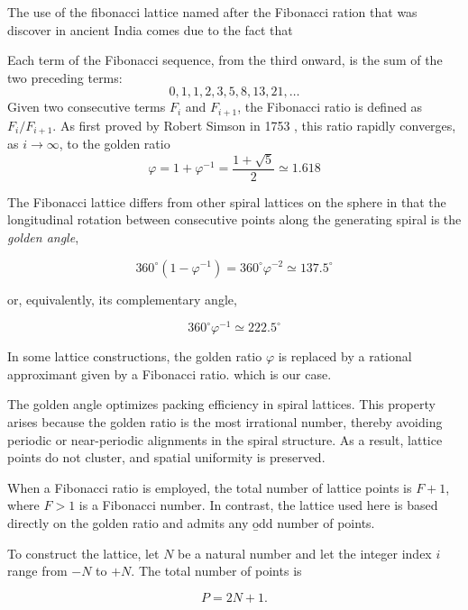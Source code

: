 The use of the fibonacci lattice named after the Fibonacci ration that was discover in ancient India \cite{fibonacci_history} comes due to the fact that 

Each term of the Fibonacci sequence, from the third onward, is the sum of the two preceding terms:
\[
0, 1, 1, 2, 3, 5, 8, 13, 21, \ldots
\]
Given two consecutive terms $F_i$ and $F_{i+1}$, the Fibonacci ratio is defined as $F_i/F_{i+1}$. As first proved by Robert Simson in 1753 \cite{fibonacci_to_golden_ratio_1} \cite{fibonacci_to_golden_ratio_2}, this ratio rapidly converges, as $i \to \infty$, to the golden ratio
\begin{equation}
  \varphi = 1 + \varphi^{-1} = \frac{1 + \sqrt{5}}{2} \simeq 1.618
  \label{eq:golden ratio}
\end{equation}

The Fibonacci lattice differs from other spiral lattices on the sphere in that the longitudinal rotation between consecutive points along the generating spiral is the \emph{golden angle},

\begin{equation*}
  360^\circ \left(1 - \varphi^{-1}\right) = 360^\circ \varphi^{-2} \simeq 137.5^\circ  
\end{equation*}

or, equivalently, its complementary angle,

\begin{equation*}
  360^\circ \varphi^{-1} \simeq 222.5^\circ
\end{equation*}

In some lattice constructions, the golden ratio $\varphi$ is replaced by a rational approximant given by a Fibonacci ratio. which is our case.

The golden angle optimizes packing efficiency in spiral lattices. This property arises because the golden ratio is the most irrational number, thereby avoiding periodic or near-periodic alignments in the spiral structure. As a result, lattice points do not cluster, and spatial uniformity is preserved.

When a Fibonacci ratio is employed, the total number of lattice points is $F + 1$, where $F > 1$ is a Fibonacci number. In contrast, the lattice used here is based directly on the golden ratio and admits any \b{odd number of points}.

To construct the lattice, let $N$ be a natural number and let the integer index $i$ range from $-N$ to $+N$. The total number of points is

\begin{equation}
P = 2N + 1 .
\end{equation}

